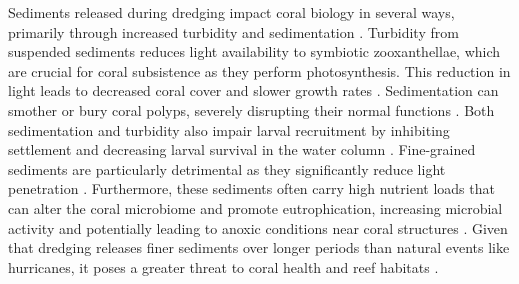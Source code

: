\documentclass[preprint,12pt,authoryear]{elsarticle}
\begin{document}


Sediments released during dredging impact coral biology in several ways, primarily through increased turbidity and sedimentation \citep{erftemeijer2012environmental,jones2015effects}. Turbidity from suspended sediments reduces light availability to symbiotic zooxanthellae, which are crucial for coral subsistence as they perform photosynthesis. This reduction in light leads to decreased coral cover and slower growth rates \citep{kendall1983effects, rogers1990responses, anthony1999tank, hennige2008photoacclimation}. Sedimentation can smother or bury coral polyps, severely disrupting their normal functions \citep{erftemeijer2012environmental, jones2015effects, jones2019sediment}. Both sedimentation and turbidity also impair larval recruitment by inhibiting settlement and decreasing larval survival in the water column \citep{jones2015effects}. Fine-grained sediments are particularly detrimental as they significantly reduce light penetration \citep{storlazzi2015influence, fourney2017additive}. Furthermore, these sediments often carry high nutrient loads that can alter the coral microbiome and promote eutrophication, increasing microbial activity and potentially leading to anoxic conditions near coral structures \citep{rosales2019oceanographic, wittenberg1992effects, weber2012mechanisms}. Given that dredging releases finer sediments over longer periods than natural events like hurricanes, it poses a greater threat to coral health and reef habitats \citep{cunning2019extensive}.
\end{document}
